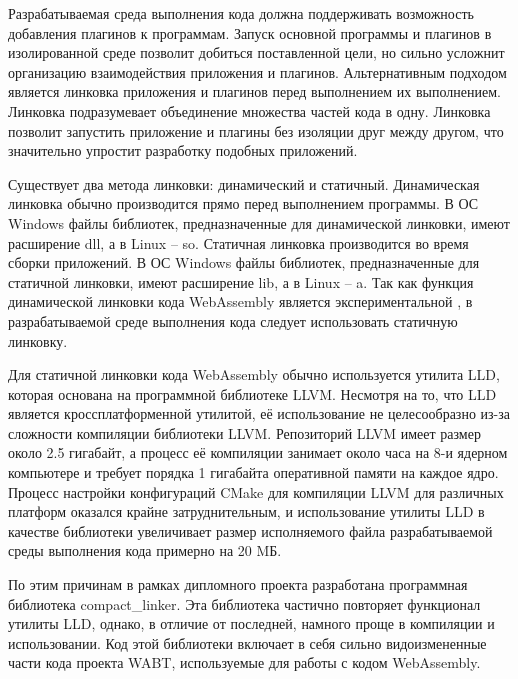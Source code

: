 Разрабатываемая среда выполнения кода должна поддерживать возможность добавления плагинов к программам.
Запуск основной программы и плагинов в изолированной среде позволит добиться поставленной цели, но сильно усложнит организацию взаимодействия приложения и плагинов.
Альтернативным подходом является линковка приложения и плагинов перед выполнением их выполнением.
Линковка подразумевает объединение множества частей кода в одну.
Линковка позволит запустить приложение и плагины без изоляции друг между другом, что значительно упростит разработку подобных приложений.

Существует два метода линковки: динамический и статичный.
Динамическая линковка обычно производится прямо перед выполнением программы.
В ОС Windows файлы библиотек, предназначенные для динамической линковки, имеют расширение dll, а в Linux -- so.
Статичная линковка производится во время сборки приложений.
В ОС Windows файлы библиотек, предназначенные для статичной линковки, имеют расширение lib, а в Linux -- a.
Так как функция динамической линковки кода WebAssembly является экспериментальной \cite{WASMDynamicLinking}, в разрабатываемой среде выполнения кода следует использовать статичную линковку.

Для статичной линковки кода WebAssembly обычно используется утилита LLD, которая основана на программной библиотеке LLVM.
Несмотря на то, что LLD является кроссплатформенной утилитой, её использование не целесообразно из-за сложности компиляции библиотеки LLVM.
Репозиторий LLVM имеет размер около 2.5 гигабайт, а процесс её компиляции занимает около часа на 8-и ядерном компьютере и требует порядка 1 гигабайта оперативной памяти на каждое ядро.
Процесс настройки конфигураций CMake для компиляции LLVM для различных платформ оказался крайне затруднительным, и использование утилиты LLD в качестве библиотеки увеличивает размер исполняемого файла разрабатываемой среды выполнения кода примерно на 20 MБ.

По этим причинам в рамках дипломного проекта разработана программная библиотека compact\_linker. 
Эта библиотека частично повторяет функционал утилиты LLD, однако, в отличие от последней, намного проще в компиляции и использовании.
Код этой библиотеки включает в себя сильно видоизмененные части кода проекта WABT, используемые для работы с кодом WebAssembly.
